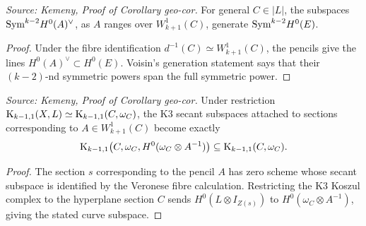\begin{lemma}
  \label{lem:kemeny_voisin_generation_observation}
  \textit{Source: Kemeny, Proof of Corollary geo-cor.}
  For general \(C\in |L|\), the subspaces
  \(\mathrm{Sym}^{k-2}H^0(A)^\vee\), as \(A\) ranges over \(W^1_{k+1}(C)\), generate
  \(\mathrm{Sym}^{k-2}H^0(E)\).
\end{lemma}
\begin{proof}
  Under the fibre identification \(d^{-1}(C)\simeq W^1_{k+1}(C)\), the pencils
  give the lines \(H^0(A)^\vee\subset H^0(E)\).  Voisin's generation statement
  says that their \((k-2)\)-nd symmetric powers span the full symmetric power.
\end{proof}

\begin{lemma}
  \label{lem:kemeny_restrict_k3_syzygies_to_curve}
  \textit{Source: Kemeny, Proof of Corollary geo-cor.}
  Under restriction
  \(\mathrm{K}_{k-1,1}(X,L)\simeq \mathrm{K}_{k-1,1}(C,\omega_C)\), the K3 secant subspaces
  attached to sections corresponding to \(A\in W^1_{k+1}(C)\) become exactly
  \[
    \mathrm{K}_{k-1,1}\bigl(C,\omega_C,H^0(\omega_C\otimes A^{-1})\bigr)
    \subseteq \mathrm{K}_{k-1,1}(C,\omega_C).
  \]
\end{lemma}
\begin{proof}
  The section \(s\) corresponding to the pencil \(A\) has zero scheme whose
  secant subspace is identified by the Veronese fibre calculation.  Restricting
  the K3 Koszul complex to the hyperplane section \(C\) sends
  \(H^0(L\otimes I_{Z(s)})\) to \(H^0(\omega_C\otimes A^{-1})\), giving the
  stated curve subspace.
\end{proof}


